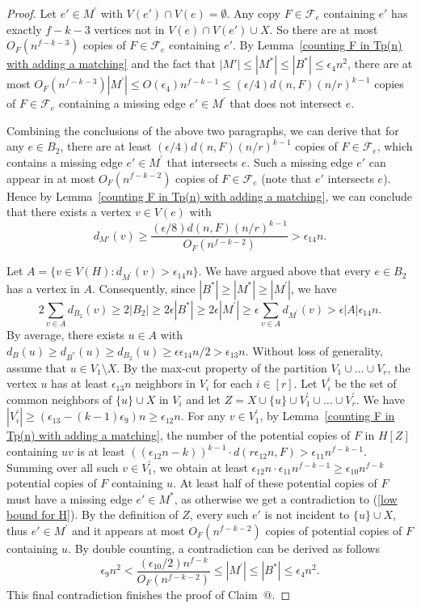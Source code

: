 \documentclass[10pt]{article}
\makeatletter
\newcommand*{\rom}[1]{\expandafter\@slowromancap\romannumeral #1@}
\makeatother
\begin{document}
\begin{proof}
Let $e'\in M^\prime$ with $V(e')\cap V(e)=\emptyset$.
Any copy $F \in \mathcal{F}_e$ containing $e'$ has exactly $f-k-3$ vertices not in $V(e)\cap V(e')\cup X$.
So there are at most $O_F(n^{f-k-3})$ copies of $F \in \mathcal{F}_e$ containing $e'$.
By Lemma~\ref{counting F in Tp(n) with adding a matching} and the fact that $|M'|\leq |M^*|\leq |B^*|\leq \epsilon_4 n^2$,
there are at most $O_F(n^{f-k-3})|M^\prime|\leq O(\epsilon_4)n^{f-k-1}\leq (\epsilon/4)d(n,F)(n/r)^{k-1}$ copies of $F\in \mathcal{F}_e$ containing a missing edge $e'\in M^\prime$ that does not intersect $e$.

Combining the conclusions of the above two paragraphs, we can derive that
for any $e\in B_2$, there are at least $(\epsilon/4)d(n,F)(n/r)^{k-1}$ copies of $F\in \mathcal{F}_e$, which contains a missing edge $e'\in M^\prime$ that intersects $e$.
Such a missing edge $e'$ can appear in at most $O_F(n^{f-k-2})$ copies of $F\in \mathcal{F}_e$ (note that $e'$ intersects $e$).
Hence by Lemma~\ref{counting F in Tp(n) with adding a matching}, we can conclude that there exists a vertex $v\in V(e)$ with
$$d_{M'}(v)\geq \frac{(\epsilon/8)d(n,F)(n/r)^{k-1}}{O_F(n^{f-k-2})}>\epsilon_{14} n.$$

Let $A=\{v\in V(H):d_{M^\prime}(v)>\epsilon_{14} n\}$.
We have argued above that every $e\in B_2$ has a vertex in $A$.
Consequently, since $|B^\ast|\geq |M^*|\geq |M^\prime|$, we have
$$2\sum_{v\in A} d_{B_2}(v)\geq 2|B_2|\geq 2\epsilon |B^\ast|\geq 2\epsilon |M^\prime|\geq \epsilon\sum_{v\in A} d_{M^\prime}(v)>\epsilon|A|\epsilon_{14} n.$$
By average, there exists $u\in A$ with $d_B(u)\geq d_{B^*}(u)\geq d_{B_2}(u)\geq \epsilon \epsilon_{14}n/2> \epsilon _{13} n$.
Without loss of generality, assume that $u\in V_1\setminus X$.
By the max-cut property of the partition $V_1\cup \ldots \cup V_r$,
the vertex $u$ has at least $\epsilon_{13}n$ neighbors in $V_i$ for each $i\in [r].$
Let $V^\prime_i$ be the set of common neighbors of $\{u\}\cup X$ in $V_i$ and let $Z=X\cup \{u\} \cup V^\prime_1\cup \ldots\cup V^\prime_r$.
We have $|V_i^\prime|\geq (\epsilon_{13}-(k-1)\epsilon_9)n \geq \epsilon_{12} n$.
For any $v\in V_1^\prime$, by Lemma~\ref{counting F in Tp(n) with adding a matching}, the number of the potential copies of $F$ in $H[Z]$ containing $uv$ is at least
$\left((\epsilon_{12}n-k)\right)^{k-1}\cdot d(r \epsilon_{12} n,F)>\epsilon_{11} n^{f-k-1}$.
Summing over all such $v\in V^\prime_1$, we obtain at least
$\epsilon_{12}n\cdot \epsilon_{11}  n^{f-k-1}\geq \epsilon_{10} n^{f-k}$ potential copies of $F$ containing $u$.
At least half of these potential copies of $F$ must have a missing edge $e'\in M^*$, as otherwise we get a contradiction to (\ref{low bound for H}).
By the definition of $Z$, every such $e'$ is not incident to $\{u\}\cup X$, thus $e'\in M^\prime$ and it appears at most $O_F(n^{f-k-2})$ copies of potential copies of $F$ containing $u$.
By double counting, a contradiction can be derived as follows
$$
\epsilon_{9}n^2< \frac{(\epsilon_{10}/2)n^{f-k}}{O_F(n^{f-k-2})}\leq |M^\prime|\leq |B^*|\leq \epsilon_4 n^2.
$$
This final contradiction finishes the proof of Claim~\rom{2}.
\end{proof}
\end{document}
